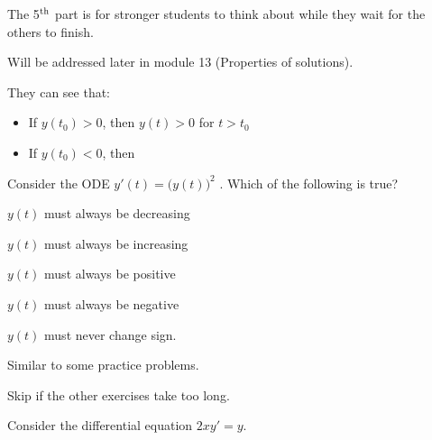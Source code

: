 \bookonlynewpage


\begin{annotation}
\begin{goals}
	The 5$^{\rm th}$ part is for stronger students to think about while they wait for the others to finish.
	
	Will be addressed later in module 13 (Properties of solutions). %
	
	They can see that:
	\begin{itemize}
		\item If $y(t_0)>0$, then $y(t)>0$ for $t>t_0$
		\item If $y(t_0)<0$, then

	\end{itemize}
\end{goals}
\end{annotation}
\question

Consider the ODE \quad $y'(t) = \big(y(t)\big)^2$ \quad .
Which of the following is true?
	
\begin{parts}
	\item $y(t)$ must always be decreasing
	\item $y(t)$ must always be increasing \\[5pt]

	\item $y(t)$ must always be positive
	\item $y(t)$ must always be negative \\[5pt]
	
	\item $y(t)$ must never change sign.
\end{parts}





\bookonlynewpage


\begin{annotation}
\begin{goals}
	Similar to some practice problems.
	
	Skip if the other exercises take too long.
\end{goals}
\end{annotation}
\question Consider the differential equation $2xy'=y$.
	
